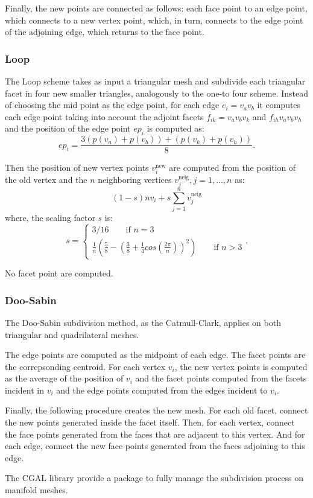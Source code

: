 Finally, the new points are connected as follows: each face point to an edge point, which connects to a new vertex point, which, in turn, connects to the edge point of the adjoining edge, which returns to the face point.


\subsubsection{Loop}
The Loop scheme takes as input a triangular mesh and subdivide each triangular facet in four new smaller triangles, analogously to the one-to four scheme.
Instead of choosing the mid point as the edge point, for each edge $e_i = v_av_b$ it computes each edge point taking into account the adjoint facets $f_{ik} = v_av_bv_k$ and $f_{ih}v_av_bv_h$ and the position of the edge point $ep_i$ is computed as:
\[
ep_i = \frac{3(p(v_a) + p(v_b)) + (p(v_k) + p(v_h)) }{8}.
\]

Then the position of new vertex points $v_i^{\text{new}}$ are computed from the position of the old vertex and the $n$ neighboring vertices $v_j^{\text{neig}}, j = 1,\dots, n$ as:
\[
(1-s) n v_i + s \sum_{j=1}^n v_j^{\text{neig}}
\]
where, the scaling factor $s$ is:
\[
s=
\begin{cases}
  3/16 \qquad \text{if $n = 3$}\\
  \frac{1}{n} \left(\frac{5}{8} - \left(\frac{3}{8} + \frac{1}{4} cos\left(\frac{2\pi}{n}\right)\right)^2\right) \qquad \text{if $n > 3$}
\end{cases}
.
\]

No facet point are computed.

\subsubsection{Doo-Sabin}

The Doo-Sabin subdivision method, as the Catmull-Clark, applies on both triangular and quadrilateral meshes.

The edge points are computed as the midpoint of each edge. 
The facet points are the correpsonding centroid. 
For each vertex $v_i$, the new vertex points is computed as the average of the position of $v_i$ and the facet points computed from the facets incident in $v_i$ and the edge points computed from the edges incident to $v_i$.

Finally, the following procedure creates the new mesh. 
For each old facet, connect the new points generated inside the facet itself.
Then, for each vertex, connect the face points generated from the faces that are adjacent to this vertex. 
And for each edge, connect the new face points generated from the faces adjoining to this edge. 




The CGAL library provide a package \cite{cgal:s-ssm2-15b} to fully manage the subdivision process on manifold meshes.



